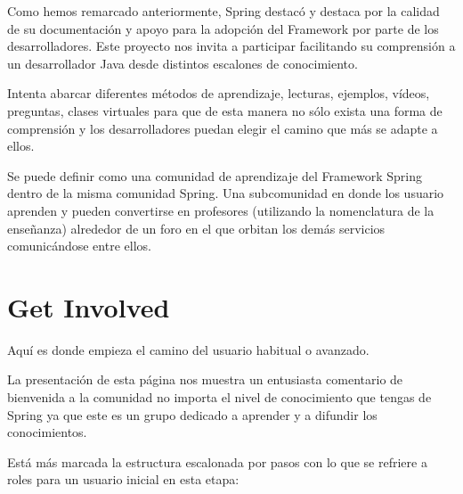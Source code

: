 \documentclass[11pt]{scrartcl}
\begin{document}
Como hemos remarcado anteriormente, Spring destac\'o y destaca por la calidad de su documentaci\'on y apoyo para la adopci\'on del Framework por parte de los desarrolladores.
Este proyecto nos invita a participar facilitando su comprensi\'on a un desarrollador Java desde distintos escalones de conocimiento.

Intenta abarcar diferentes m\'etodos de aprendizaje, lecturas, ejemplos, vídeos, preguntas, clases virtuales para que de esta manera no s\'olo exista una forma de comprensi\'on y los desarrolladores puedan elegir el camino que m\'as se adapte a ellos.

Se puede definir como una comunidad de aprendizaje del Framework Spring dentro de la misma comunidad Spring. Una subcomunidad en donde los usuario aprenden y pueden convertirse en profesores (utilizando la nomenclatura de la ense\~nanza) alrededor de un foro en el que orbitan los dem\'as servicios comunic\'andose entre ellos.

\section{Get Involved}

Aqu\'i es donde empieza el camino del usuario habitual o avanzado.

La presentaci\'on de esta p\'agina nos muestra un entusiasta comentario de bienvenida a la comunidad no importa el nivel de conocimiento que tengas de Spring ya que este es un grupo dedicado a aprender y a difundir los conocimientos.

Est\'a m\'as marcada la estructura escalonada por pasos con lo que se refriere a roles para un usuario inicial en esta etapa:
\end{document}
